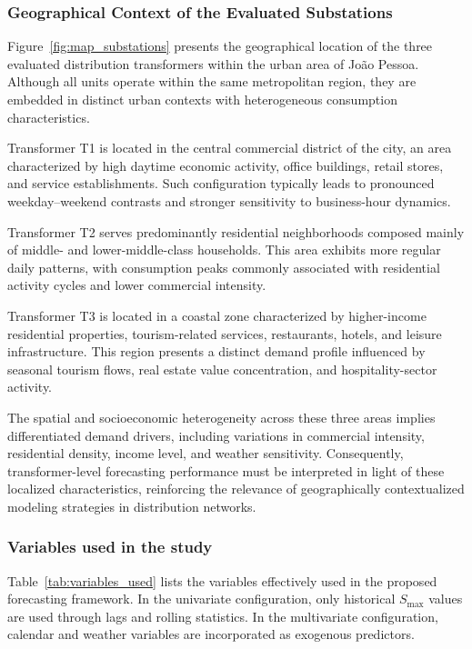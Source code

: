 \subsubsection{Geographical Context of the Evaluated Substations}

Figure~\ref{fig:map_substations} presents the geographical location of the three evaluated distribution transformers within the urban area of João Pessoa. Although all units operate within the same metropolitan region, they are embedded in distinct urban contexts with heterogeneous consumption characteristics.

Transformer T1 is located in the central commercial district of the city, an area characterized by high daytime economic activity, office buildings, retail stores, and service establishments. Such configuration typically leads to pronounced weekday–weekend contrasts and stronger sensitivity to business-hour dynamics.

Transformer T2 serves predominantly residential neighborhoods composed mainly of middle- and lower-middle-class households. This area exhibits more regular daily patterns, with consumption peaks commonly associated with residential activity cycles and lower commercial intensity.

Transformer T3 is located in a coastal zone characterized by higher-income residential properties, tourism-related services, restaurants, hotels, and leisure infrastructure. This region presents a distinct demand profile influenced by seasonal tourism flows, real estate value concentration, and hospitality-sector activity.

The spatial and socioeconomic heterogeneity across these three areas implies differentiated demand drivers, including variations in commercial intensity, residential density, income level, and weather sensitivity. Consequently, transformer-level forecasting performance must be interpreted in light of these localized characteristics, reinforcing the relevance of geographically contextualized modeling strategies in distribution networks.


\subsubsection{Variables used in the study}
Table~\ref{tab:variables_used} lists the variables effectively used in the proposed forecasting framework. In the univariate configuration, only historical $S_{\max}$ values are used through lags and rolling statistics. In the multivariate configuration, calendar and weather variables are incorporated as exogenous predictors.

